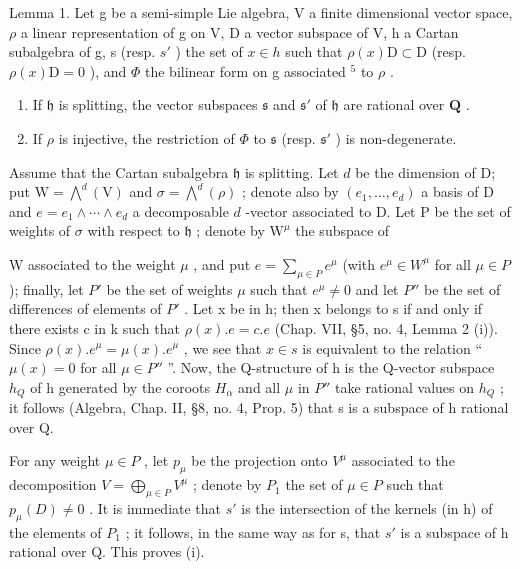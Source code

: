 Lemma 1. Let g be a semi-simple Lie algebra, V a finite dimensional vector space, \(\rho\) a linear representation of g on V, D a vector subspace of V, h a Cartan subalgebra of g, s (resp. \(s'\) ) the set of \(x \in h\) such that \(\rho(x)\mathrm{D} \subset \mathrm{D}\) (resp. \(\rho(x)\mathrm{D} = 0\) ), and \(\Phi\) the bilinear form on g associated \(^{5}\) to \(\rho\) .

\begin{enumerate}
\def\labelenumi{(\roman{enumi})}
\item
  If \(\mathfrak{h}\) is splitting, the vector subspaces \(\mathfrak{s}\) and \(\mathfrak{s}'\) of \(\mathfrak{h}\) are rational over \(\mathbf{Q}\) .
\item
  If \(\rho\) is injective, the restriction of \(\Phi\) to \(\mathfrak{s}\) (resp. \(\mathfrak{s}'\) ) is non-degenerate.
\end{enumerate}

Assume that the Cartan subalgebra \(\mathfrak{h}\) is splitting. Let \(d\) be the dimension of D; put \(\mathrm{W} = \bigwedge^{d}(\mathrm{V})\) and \(\sigma = \bigwedge^{d}(\rho)\) ; denote also by \((e_1, \ldots, e_d)\) a basis of D and \(e = e_1 \wedge \cdots \wedge e_d\) a decomposable \(d\) -vector associated to D. Let P be the set of weights of \(\sigma\) with respect to \(\mathfrak{h}\) ; denote by \(\mathrm{W}^{\mu}\) the subspace of

W associated to the weight \(\mu\) , and put \(e = \sum_{\mu \in P} e^{\mu}\) (with \(e^{\mu} \in W^{\mu}\) for all \(\mu \in P\) ); finally, let \(P'\) be the set of weights \(\mu\) such that \(e^{\mu} \neq 0\) and let \(P''\) be the set of differences of elements of \(P'\) . Let x be in h; then x belongs to s if and only if there exists c in k such that \(\rho(x).e = c.e\) (Chap. VII, §5, no. 4, Lemma 2 (i)). Since \(\rho(x).e^{\mu} = \mu(x).e^{\mu}\) , we see that \(x \in s\) is equivalent to the relation `` \(\mu(x) = 0\) for all \(\mu \in P''\) ''. Now, the Q-structure of h is the Q-vector subspace \(h_{Q}\) of h generated by the coroots \(H_{\alpha}\) and all \(\mu\) in \(P''\) take rational values on \(h_{Q}\) ; it follows (Algebra, Chap. II, §8, no. 4, Prop. 5) that s is a subspace of h rational over Q.

For any weight \(\mu\in P\) , let \(p_{\mu}\) be the projection onto \(V^{\mu}\) associated to the decomposition \(V=\bigoplus_{\mu\in P}V^{\mu}\) ; denote by \(P_{1}\) the set of \(\mu\in P\) such that \(p_{\mu}(D)\neq0\) . It is immediate that \(s'\) is the intersection of the kernels (in h) of the elements of \(P_{1}\) ; it follows, in the same way as for s, that \(s'\) is a subspace of h rational over Q. This proves (i).


